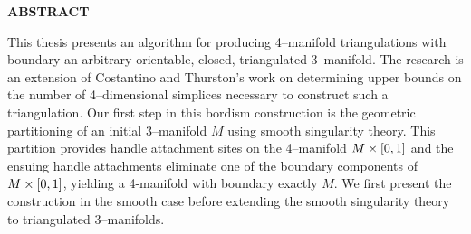 \newpage
\newpage{}


\begin{center}
\textbf{ABSTRACT}
\end{center}

This thesis presents an algorithm for producing 4--manifold triangulations with boundary an arbitrary orientable, closed, triangulated 3--manifold.
The research is an extension of Costantino and Thurston's work on determining upper bounds on the number of 4--dimensional simplices necessary to construct such a triangulation.
Our first step in this bordism construction is the geometric partitioning of an initial 3--manifold $M$ using smooth singularity theory.
This partition provides handle attachment sites on the 4--manifold $M \times [0,1]$ and the ensuing handle attachments eliminate one of the boundary components of $M\times [0,1]$, yielding a 4-manifold with boundary exactly $M$.
We first present the construction in the smooth case before extending the smooth singularity theory to triangulated 3--manifolds.

\pagebreak